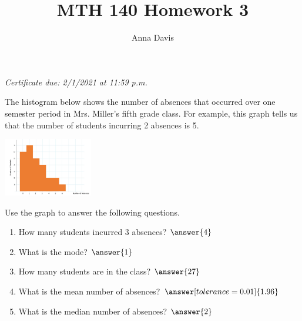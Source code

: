 \documentclass{ximera}
\author{Anna Davis} \title{MTH 140 Homework 3}
\begin{document}
\begin{abstract}

\end{abstract}
\maketitle
 \textit{Certificate due: 2/1/2021 at 11:59 p.m.}
 
 \begin{problem}\label{prob:140hom2prob3}
The histogram below shows the number of absences that occurred over one semester period in Mrs. Miller's fifth grade class.  For example, this graph tells us that the number of students incurring 2 absences is 5.

\begin{image}
   \includegraphics[height=1in]{140H2pic6.jpg}
 \end{image}
 
 Use the graph to answer the following questions.
 
 \begin{enumerate}
     \item How many students incurred 3 absences? $\answer{4}$
     \item What is the mode? $\answer{1}$
     \item How many students are in the class? $\answer{27}$
     \item What is the mean number of absences? $\answer[tolerance=0.01]{1.96}$
     \item What is the median number of absences? $\answer{2}$
 \end{enumerate}
\end{problem}
\end{document}
